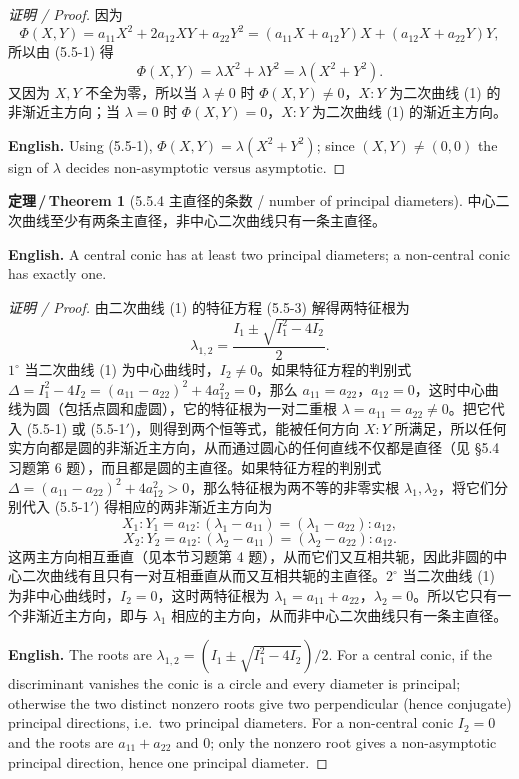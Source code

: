 \documentclass[UTF8,11pt,a4paper]{ctexart}
\newcommand{\EN}[1]{\par\noindent \textbf{English.} #1\par}
\theoremstyle{definition}
\newtheorem*{theorem}{定理\,/\,Theorem}
\begin{document}
\begin{proof}[证明 / Proof]
因为
\[
\Phi(X,Y)=a_{11}X^2+2a_{12}XY+a_{22}Y^2=(a_{11}X+a_{12}Y)X+(a_{12}X+a_{22}Y)Y,
\]
所以由 (5.5-1) 得
\[
\Phi(X,Y)=\lambda X^2+\lambda Y^2=\lambda(X^2+Y^2).
\]
又因为 $X,Y$ 不全为零，所以当 $\lambda\ne0$ 时 $\Phi(X,Y)\ne0$，$X:Y$ 为二次曲线 (1) 的非渐近主方向；当 $\lambda=0$ 时 $\Phi(X,Y)=0$，$X:Y$ 为二次曲线 (1) 的渐近主方向。
\EN{Using (5.5-1), $\Phi(X,Y)=\lambda(X^2+Y^2)$; since $(X,Y)\ne(0,0)$ the sign of $\lambda$ decides non-asymptotic versus asymptotic.}
\end{proof}

\begin{theorem}[5.5.4 主直径的条数 / number of principal diameters]\label{thm:num-principal}
中心二次曲线至少有两条主直径，非中心二次曲线只有一条主直径。
\EN{A central conic has at least two principal diameters; a non-central conic has exactly one.}
\end{theorem}

\begin{proof}[证明 / Proof]
由二次曲线 (1) 的特征方程 (5.5-3) 解得两特征根为
\[
\lambda_{1,2}=\frac{I_1\pm\sqrt{I_1^2-4I_2}}{2}.
\]
$1^\circ$ 当二次曲线 (1) 为中心曲线时，$I_2\ne0$。如果特征方程的判别式 $\Delta=I_1^2-4I_2=(a_{11}-a_{22})^2+4a_{12}^2=0$，那么 $a_{11}=a_{22}$，$a_{12}=0$，这时中心曲线为圆（包括点圆和虚圆），它的特征根为一对二重根 $\lambda=a_{11}=a_{22}\ne0$。把它代入 (5.5-1) 或 (5.5-1$'$)，则得到两个恒等式，能被任何方向 $X:Y$ 所满足，所以任何实方向都是圆的非渐近主方向，从而通过圆心的任何直线不仅都是直径（见 §5.4 习题第 6 题），而且都是圆的主直径。如果特征方程的判别式 $\Delta=(a_{11}-a_{22})^2+4a_{12}^2>0$，那么特征根为两不等的非零实根 $\lambda_1,\lambda_2$，将它们分别代入 (5.5-1$'$) 得相应的两非渐近主方向为
\[
X_1:Y_1=a_{12}:(\lambda_1-a_{11})=(\lambda_1-a_{22}):a_{12},
\]
\[
X_2:Y_2=a_{12}:(\lambda_2-a_{11})=(\lambda_2-a_{22}):a_{12}.
\]
这两主方向相互垂直（见本节习题第 4 题），从而它们又互相共轭，因此非圆的中心二次曲线有且只有一对互相垂直从而又互相共轭的主直径。$2^\circ$ 当二次曲线 (1) 为非中心曲线时，$I_2=0$，这时两特征根为 $\lambda_1=a_{11}+a_{22}$，$\lambda_2=0$。所以它只有一个非渐近主方向，即与 $\lambda_1$ 相应的主方向，从而非中心二次曲线只有一条主直径。
\EN{The roots are $\lambda_{1,2}=(I_1\pm\sqrt{I_1^2-4I_2})/2$. For a central conic, if the discriminant vanishes the conic is a circle and every diameter is principal; otherwise the two distinct nonzero roots give two perpendicular (hence conjugate) principal directions, i.e.\ two principal diameters. For a non-central conic $I_2=0$ and the roots are $a_{11}+a_{22}$ and $0$; only the nonzero root gives a non-asymptotic principal direction, hence one principal diameter.}
\end{proof}
\end{document}
